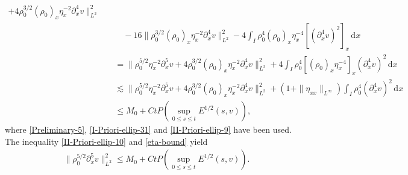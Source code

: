 \documentclass[11pt, reqno]{amsart}
\newcommand{\diff}{\mathrm{d}}
\numberwithin{equation}{section}
\begin{document}
{\begin{equation}
\begin{aligned}
+4\rho_0^{3/2}(\rho_0)_x\eta_x^{-2}\partial_x^4v\|_{L^2}^2\\
&\qquad-16\|\rho_0^{3/2}(\rho_0)_x\eta_x^{-2}\partial_x^4v\|_{L^2}^2-4\int_I\rho_0^4(\rho_0)_x\eta_x^{-4}[(\partial_x^4v)^2]_x\,\diff x\\
&\quad= \|\rho_0^{5/2}\eta_x^{-2}\partial_x^5v
+4\rho_0^{3/2}(\rho_0)_x\eta_x^{-2}\partial_x^4v\|_{L^2}^2
+4\int_I\rho_0^4[(\rho_0)_x\eta_x^{-4}]_x(\partial_x^4v)^2\,\diff x\\
&\quad\lesssim \|\rho_0^{5/2}\eta_x^{-2}\partial_x^5v
+4\rho_0^{3/2}(\rho_0)_x\eta_x^{-2}\partial_x^4v\|_{L^2}^2
+(1+\|\eta_{xx}\|_{L^\infty})\int_I\rho_0^4(\partial_x^4v)^2\,\diff x\\
&\quad\leq M_0+Ct P(\sup_{0\leq s\leq t}E^{1/2}(s,v)),
\end{aligned}
\end{equation}
where \eqref{Preliminary-5}, \eqref{I-Priori-ellip-31} and \eqref{II-Priori-ellip-9} have been used.
The inequality \eqref{II-Priori-ellip-10} and \eqref{eta-bound} yield
\begin{equation}\label{II-Priori-ellip-11}
\begin{aligned}
\|\rho_0^{5/2}\partial_x^5v\|_{L^2}^2\leq M_0+Ct P(\sup_{0\leq s\leq t}E^{1/2}(s,v)).
\end{aligned}
\end{equation}


}
\end{document}
